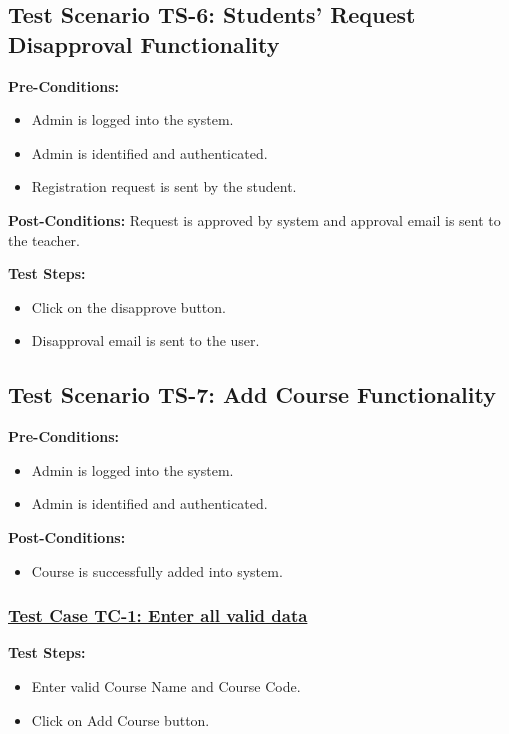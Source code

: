 \subsection{Test Scenario TS-6: Students' Request Disapproval Functionality}
\textbf{Pre-Conditions: }
\begin{itemize}

\item Admin is logged into the system.
\item Admin is identified and authenticated.
\item Registration request is sent by the student.

\end{itemize}
\textbf{Post-Conditions: } Request is approved by system and approval email is sent to the teacher. 

\textbf{Test Steps:}
\begin{itemize}

\item Click on the disapprove button.
\item Disapproval email is sent to the user.

\end{itemize}

\subsection{Test Scenario TS-7: Add Course Functionality}
\textbf{Pre-Conditions: } 
\begin{itemize}

\item Admin is logged into the system.
\item Admin is identified and authenticated.

\end{itemize}

\textbf{Post-Conditions: }
\begin{itemize}
\item Course is successfully added into system.
\end{itemize}

\subsubsection{\underline{Test Case TC-1: Enter all valid data}}
\textbf{Test Steps:}
\begin{itemize}

\item Enter valid Course Name and Course Code.
\item Click on Add Course button.

\end{itemize}

